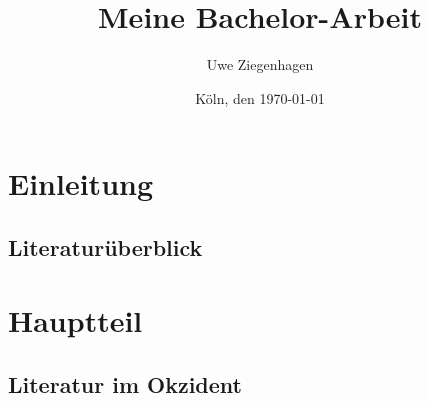 \documentclass[12pt,ngerman,parskip=half,DIV=12]{scrbook}
\author{Uwe Ziegenhagen}
\title{Meine Bachelor-Arbeit}
\date{Köln, den \today}
\begin{document}
\maketitle

\tableofcontents

\listoffigures

\listoftables

\chapter{Einleitung}

\section{Literaturüberblick}

\blindtext[5]

\blindtext[5]

\blindtext[5]

\blindtext[5]

\blindtext[5]

\chapter{Hauptteil}

\section{Literatur im Okzident}

\blindtext[5]

\blindtext[5]

\blindtext[5]

\blindtext[5]

\blindtext[5]
\end{document}
